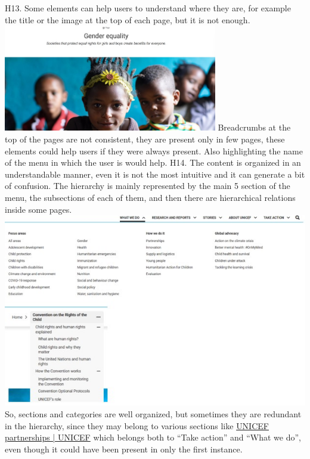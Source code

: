 \newline
\newline H13.	Some elements can help users to understand where they are, for example the title or the image at the top of each page, but it is not enough.
\newline \includegraphics[width=0.7\textwidth]{FinalScores17.jpg}
\newline Breadcrumbs at the top of the pages are not consistent, they are present only in few pages, these elements could help users if they were always present.
\newline Also highlighting the name of the menu in which the user is would help.
\newline
\newline H14.	The content is organized in an understandable manner, even it is not the most intuitive and it can generate a bit of confusion.
\newline The hierarchy is mainly represented by the main 5 section of the menu, the subsections of each of them, and then there are hierarchical relations inside some pages.   
\newline \includegraphics[width=\textwidth]{FinalScores18.jpg}
So, sections and categories are well organized, but sometimes they are redundant in the hierarchy, since they may belong to various sections like \href{https://www.unicef.org/partnerships}{UNICEF partnerships | UNICEF} which belongs both to “Take action” and “What we do”, even though it could have been present in only the first instance. 

